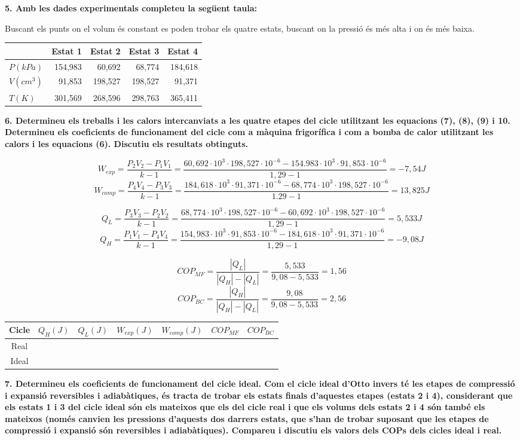\documentclass[a4paper]{article}
\begin{document}
\textbf{5. Amb les dades experimentals completeu la següent taula:}

Buscant els punts on el volum és constant es poden trobar els quatre estats, buscant on la pressió és més alta i on és més baixa.

\begin{center}
	\begin{tabular}{l|rrrr}
		& Estat 1 & Estat 2 & Estat 3 & Estat 4 \\
		\hline
		$P(kPa)$ & 154,983 & 60,692 & 68,774 & 184,618 \\
		$V(cm^3)$ & 91,853 & 198,527 & 198,527 & 91,371 \\
		$T(K)$ & 301,569 & 268,596 & 298,763 & 365,411 \\
	\end{tabular}
\end{center}

\textbf{6. Determineu els treballs i les calors intercanviats a les quatre etapes del cicle utilitzant les equacions (7), (8), (9) i 10. Determineu els coeficients de funcionament del cicle com a màquina frigorífica i com a bomba de calor utilitzant les calors i les equacions (6). Discutiu els resultats obtinguts.}

$$ W_{exp} = \frac{P_2 V_2 - P_1 V_1}{k - 1} = 
\frac{60,692·10^3 · 198,527·10^{-6} - 154.983·10^3 · 91,853·10^{-6}}{1,29 - 1} =
\boxed{-7,54J} 
$$
$$ W_{comp} = \frac{P_4 V_4 - P_3 V_3}{k - 1} = 
\frac{184,618·10^3 · 91,371·10^{-6} - 68,774·10^3 · 198,527·10^{-6}}{1.29 - 1} =
\boxed{13,825J}
$$

$$ Q_L = \frac{P_3 V_3 - P_2 V_2}{k - 1} = 
\frac{68,774·10^3 · 198,527·10^{-6} - 60,692·10^3 · 198,527·10^{-6}}{1,29 - 1} = 
\boxed{5,533J}
$$
$$ Q_H = \frac{P_1 V_1 - P_4 V_4}{k - 1} =
\frac{154,983·10^3 · 91,853·10^{-6} - 184,618·10^3 · 91,371·10^{-6}}{1,29 - 1} =
\boxed{-9,08J}
$$

$$ COP_{MF} = \frac{|Q_L|}{|Q_H| - |Q_L|} =
\frac{5,533}{9,08 - 5,533} = \boxed{1,56} $$
$$ COP_{BC} = \frac{|Q_H|}{|Q_H| - |Q_L|} =
\frac{9,08}{9,08 - 5,533} = \boxed{2,56} $$

\begin{tabular}{c|cccccc}
    Cicle & $Q_H(J)$ & $Q_L(J)$ & $W_{exp}(J)$ & $W_{comp}(J)$ & $COP_{MF}$ & $COP_{BC}$ \\
    \hline
    Real & & & & & & \\
    Ideal & & & & & &
\end{tabular}

\textbf{7. Determineu els coeficients de funcionament del cicle ideal. Com el cicle ideal d’Otto invers té les etapes de compressió i expansió reversibles i adiabàtiques, és tracta de trobar els estats finals d’aquestes etapes (estats 2 i 4), considerant que els estats 1 i 3 del cicle ideal són els mateixos que els del cicle real i que els volums dels estats 2 i 4 són també els mateixos (només canvien les pressions d’aquests dos darrers estats, que s’han de trobar suposant que les etapes de compressió i expansió són reversibles i adiabàtiques). Compareu i discutiu els valors dels COPs dels cicles ideal i real.}
\end{document}

